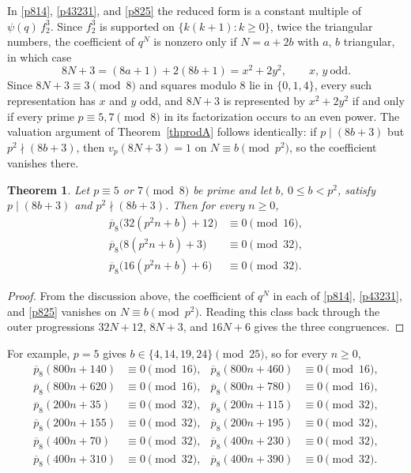 \documentclass[11pt, reqno]{amsart}
\newtheorem{theorem}{Theorem}[section]
\numberwithin{equation}{section}
\begin{document}
	In \eqref{p814}, \eqref{p43231}, and \eqref{p825} the reduced form is a
	constant multiple of $\psi(q)\,f_2^3$. Since $f_2^3$ is supported on
	$\{k(k+1):k\ge0\}$, twice the triangular numbers, the coefficient of $q^N$ is
	nonzero only if $N=a+2b$ with $a$, $b$ triangular, in which case
	\begin{equation}
		8N+3=(8a+1)+2(8b+1)=x^2+2y^2,\qquad x,\,y\ \text{odd}.\label{tform2}
	\end{equation}
	Since $8N+3\equiv3\pmod8$ and squares modulo $8$ lie in $\{0,1,4\}$, every
	such representation has $x$ and $y$ odd, and $8N+3$ is represented by
	$x^2+2y^2$ if and only if every prime $p\equiv5,7\pmod8$ in its factorization
	occurs to an even power. The valuation argument of Theorem~\ref{thprodA}
	follows identically: if $p\mid(8b+3)$ but $p^2\nmid(8b+3)$, then
	$v_p(8N+3)=1$ on $N\equiv b\pmod{p^2}$, so the coefficient vanishes there.
	
	\begin{theorem}\label{thprodB}
		Let $p\equiv5$ or $7\pmod8$ be prime and let $b$, $0\le b<p^2$, satisfy
		$p\mid(8b+3)$ and $p^2\nmid(8b+3)$. Then for every $n\ge0$,
		\begin{align}
			\overline{p}_{8}\bigl(32(p^2n+b)+12\bigr)&\equiv0\pmod{16},\\
			\overline{p}_{8}\bigl(8(p^2n+b)+3\bigr)&\equiv0\pmod{32},\\
			\overline{p}_{8}\bigl(16(p^2n+b)+6\bigr)&\equiv0\pmod{32}.
		\end{align}
	\end{theorem}
	\begin{proof}
		From the discussion above, the coefficient of $q^N$ in each of \eqref{p814},
		\eqref{p43231}, and \eqref{p825} vanishes on $N\equiv b\pmod{p^2}$. Reading
		this class back through the outer progressions $32N+12$, $8N+3$, and $16N+6$
		gives the three congruences.
	\end{proof}
	For example, $p=5$ gives $b\in\{4,14,19,24\}\pmod{25}$, so for every
	$n\ge0$,
	\begin{align}
		\overline{p}_{8}(800n+140)&\equiv0\pmod{16}, &
		\overline{p}_{8}(800n+460)&\equiv0\pmod{16},\\
		\overline{p}_{8}(800n+620)&\equiv0\pmod{16}, &
		\overline{p}_{8}(800n+780)&\equiv0\pmod{16},\\
		\overline{p}_{8}(200n+35)&\equiv0\pmod{32}, &
		\overline{p}_{8}(200n+115)&\equiv0\pmod{32},\\
		\overline{p}_{8}(200n+155)&\equiv0\pmod{32}, &
		\overline{p}_{8}(200n+195)&\equiv0\pmod{32},\\
		\overline{p}_{8}(400n+70)&\equiv0\pmod{32}, &
		\overline{p}_{8}(400n+230)&\equiv0\pmod{32},\\
		\overline{p}_{8}(400n+310)&\equiv0\pmod{32}, &
		\overline{p}_{8}(400n+390)&\equiv0\pmod{32}.
	\end{align}
	
\end{document}
